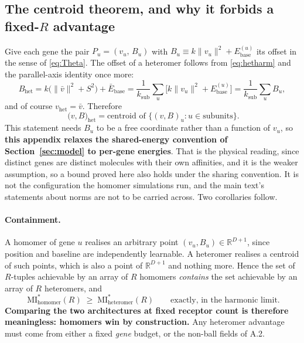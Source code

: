 \documentclass[11pt,a4paper]{article}
\newcommand{\RR}{\mathbb{R}}
\newcommand{\ksub}{k_{\mathrm{sub}}}
\newcommand{\Ebase}{E_{\mathrm{base}}}
\begin{document}
\subsection{The centroid theorem, and why it forbids a fixed-$R$ advantage}

Give each gene the pair $P_u=(v_u,\,B_u)$ with
$B_u\equiv k\|v_u\|^2+\Ebase^{(u)}$ its offset in the sense of \eqref{eq:Theta}. The
offset of a heteromer follows from \eqref{eq:hetharm} and the parallel-axis identity
once more:
\begin{equation}
  B_{\mathrm{het}} = k\big(\|\bar v\|^2+S^2\big)+\bar{E}_{\mathrm{base}}
   = \frac{1}{\ksub}\sum_u\Big[k\|v_u\|^2+\Ebase^{(u)}\Big]
   = \frac{1}{\ksub}\sum_u B_u ,
\end{equation}
and of course $v_{\mathrm{het}}=\bar v$. Therefore
\begin{equation}
  \boxed{\;\big(v,B\big)_{\mathrm{het}}
   = \text{centroid of } \big\{(v,B)_u : u \in \text{subunits}\big\}. }
\end{equation}
This statement needs $B_u$ to be a free coordinate rather than a function of $v_u$, so
\textbf{this appendix relaxes the shared-energy convention of Section~\ref{sec:model} to
per-gene energies}. That is the physical reading, since distinct genes are distinct
molecules with their own affinities, and it is the weaker assumption, so a bound proved
here also holds under the sharing convention. It is not the configuration the homomer
simulations run, and the main text's statements about norms are not to be carried across.
Two corollaries follow.

\paragraph{Containment.} A homomer of gene $u$ realises an arbitrary point
$(v_u,B_u)\in\RR^{D+1}$, since position and baseline are independently learnable. A
heteromer realises a centroid of such points, which is also a point of $\RR^{D+1}$ and
nothing more. Hence the set of $R$-tuples achievable by an array of $R$ homomers
\emph{contains} the set achievable by an array of $R$ heteromers, and
\begin{equation}
  \boxed{\;\mathrm{MI}^{*}_{\mathrm{homomer}}(R)\;\ge\;\mathrm{MI}^{*}_{\mathrm{heteromer}}(R)
  \qquad\text{exactly, in the harmonic limit.}}
\end{equation}
\textbf{Comparing the two architectures at fixed receptor count is therefore
meaningless: homomers win by construction.} Any heteromer advantage must come from
either a fixed \emph{gene} budget, or the non-ball fields of A.2.
\end{document}
